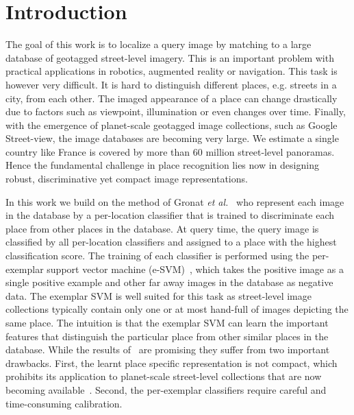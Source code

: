 \documentclass[table]{article} %
\begin{document}
\section{Introduction}

The goal of this work is to localize a query image by matching to a large database of geotagged street-level imagery.
This is an important problem with practical applications in robotics, augmented reality or navigation. 
This task is however very difficult. It is hard to distinguish different places, e.g. streets in a city, from each other. The 
imaged appearance of a place can change drastically due to factors such as  viewpoint, illumination or even changes over time.
Finally, with the emergence of planet-scale geotagged image collections, such as Google Street-view, the image databases are becoming very large.   
We estimate a single country like France is covered by more than 60 million street-level panoramas. 
Hence the fundamental challenge in place recognition lies now in designing robust, discriminative yet compact image representations.

In this work we build on the method of Gronat {\it et al.}~\cite{Gronat13} who represent each image in the database by a per-location classifier
that is trained to discriminate each place from other places in the database. At query time, the query image is classified by all per-location classifiers and assigned to a place with the highest classification score. The training of each classifier is performed using the per-exemplar support vector machine (e-SVM)~\cite{Malisiewicz11}, which takes the positive image
as a single positive example and other far away images in the database as negative data. 
The exemplar SVM is well suited for this task as street-level image collections typically contain only one or at most hand-full of images depicting the same place. The intuition is that the exemplar SVM can learn the important features that distinguish the particular place from other similar places  in the database.  While the results of~\cite{Gronat13} are promising they suffer from two important drawbacks. First, the learnt place specific representation is not compact, 
 which prohibits its application to planet-scale street-level collections that are now becoming available~\cite{Klinger13}. Second, the per-exemplar classifiers require careful and time-consuming calibration.
\end{document}
